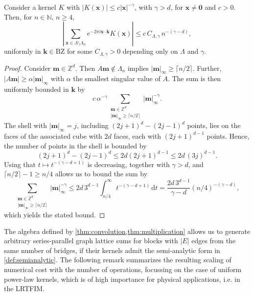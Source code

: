 \documentclass[]{amsart}
\numberwithin{mythm}{section}
\begin{document}
\begin{lemma}
\label{lem:compression}
Consider a kernel $K$ with $|K(\bm x)|\le c \vert \bm x\vert^{-\gamma}$, with $\gamma>d$, for $\bm x\neq \bm 0$ and $c>0$. Then, for $n \in \mathds N$, $n\ge 4$,
\[
\left \vert \sum_{\bm x\in \Lambda\setminus \Lambda_n} e^{-2\pi i \bm x\cdot \bm k} K(\bm x) \right \vert \le c \,C_{\Lambda,\gamma}\, n^{-(\gamma-d)},
\]
uniformly in $\bm k\in \mathrm{BZ}$ for some $C_{\Lambda,\gamma}>0$ depending only on $\Lambda$ and $\gamma$.
\end{lemma}
\begin{proof}
    Consider $\bm m \in \mathds Z^d$. Then $A\bm m\not\in \Lambda_n$ implies $\vert \bm m\vert_\infty\ge \lceil n/2\rceil$. Further, $\vert A\bm m\vert\ge \alpha \vert \bm m\vert_{\infty}$ with $\alpha$ the smallest singular value of $A$. The sum is then uniformly bounded in $\bm k$ by
    \[
    c\,\alpha^{-\gamma}\sum_{\substack{\bm m\in \mathds Z^d\\ \vert \bm m\vert_\infty\ge \lceil n/2\rceil}}\vert \bm m\vert_\infty^{-\gamma}.
    \]
    The shell with $\vert \bm m\vert_\infty = j$, including $(2j+1)^d-(2j-1)^d$ points, lies on the faces of the associated cube with $2d$ faces, each with $(2j+1)^{d-1}$ points. Hence, the number of points in the shell is bounded by
    \[
    (2j+1)^d-(2j-1)^d\le  2d (2j+1)^{d-1}\le 2d\,(3j)^{d-1}.
    \]
    Using that $t\mapsto t^{-(\gamma-d+1)}$ is decreasing, together with $\gamma>d$, and  $\lceil n/2 \rceil-1\ge n/4$ allows us to bound the sum by 
    \[
    \sum_{\substack{\bm m\in \mathds Z^d\\ \vert \bm m\vert_\infty\ge \lceil n/2\rceil}}\vert \bm m\vert_\infty^{-\gamma}\le 2d\,3^{d-1}\int_{n/4}^\infty t^{-(\gamma-d+1)}\,\mathrm d t= \frac{2d\,3^{d-1}}{\gamma-d}(n/4)^{-(\gamma-d)},
    \]
    which yields the stated bound.
\end{proof}



The algebra defined by \cref{thm:convolution,thm:multiplication} allows us to generate arbitrary series-parallel graph lattice sums for blocks with $|E|$ edges from the same number of bridges, if their kernels admit the semi-analytic form in \cref{def:semianalytic}. The following remark summarizes the resulting scaling of numerical cost with the number of operations, focussing on the case of uniform power-law kernels, which is of high importance for physical applications, i.e. in the LRTFIM.
\end{document}
